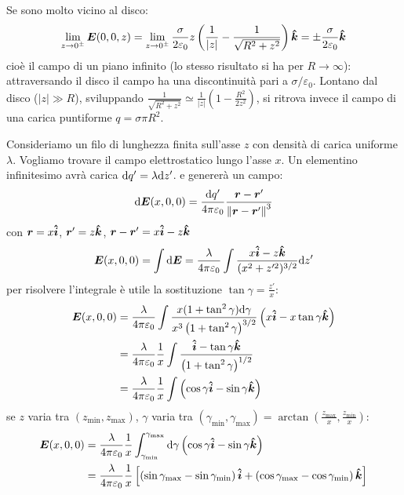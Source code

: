 \begin{Es}[Disco]
  Se sono molto vicino al disco:
  \[
    \lim_{z\to 0^\pm}\boldsymbol{E}(0,0,z)=\lim_{z\to 0^\pm} \frac{\sigma}{2\varepsilon_0} z\left(\frac{1}{|z|}-\frac{1}{\sqrt{R^2+z^2}}\right)\boldsymbol{\hat {k}}=\pm\frac{\sigma}{2\varepsilon_0}\boldsymbol{\hat {k}}
  \]
  cioè il campo di un piano infinito (lo stesso risultato si ha per $R\to\infty$): attraversando il disco il campo ha una discontinuità pari a $\sigma/\varepsilon_0$. Lontano dal disco ($|z|\gg R$), sviluppando $\frac{1}{\sqrt{R^2+z^2}}\simeq\frac{1}{|z|}\left(1-\frac{R^2}{2z^2}\right)$, si ritrova invece il campo di una carica puntiforme $q=\sigma\pi R^2$.
\end{Es}
\begin{Es}
  Consideriamo un filo di lunghezza finita sull'asse $z$ con densità di carica uniforme $\lambda$. Vogliamo trovare il campo elettrostatico lungo l'asse $x$. Un elementino infinitesimo avrà carica $\mathrm{d} q'=\lambda\mathrm{d} z'$. e genererà un campo:
  \[
    \mathrm{d}\boldsymbol{E}(x,0,0) = \frac{\mathrm{d} q'}{4\pi\varepsilon_0}\frac{\boldsymbol{r}-\boldsymbol{r}'}{\left\lVert\boldsymbol{r}-\boldsymbol{r}'\right\rVert^3}
  \]
  con $\boldsymbol{r}=x\boldsymbol{\hat {i}}$, $\boldsymbol{r}'=z\boldsymbol{\hat {k}}$, $\boldsymbol{r}-\boldsymbol{r}'=x\boldsymbol{\hat {i}}-z \boldsymbol{\hat {k}}$
  \[
    \boldsymbol{E}(x,0,0)=\int\mathrm{d} \boldsymbol{E}=\frac{\lambda}{4\pi\varepsilon_0}\int\frac{x\boldsymbol{\hat {i}}-z\boldsymbol{\hat {k}}}{(x^2+z'^2)^{3/2}}\mathrm{d} z'
  \]
  per risolvere l'integrale è utile la sostituzione $\tan\gamma=\frac{z'}{x}$:
  \begin{align*}
    \boldsymbol{E}(x,0,0) & =\frac{\lambda}{4\pi\varepsilon_0}\int\frac{x(1+\tan^2\gamma)\mathrm{d}\gamma}{x^3\left(1+\tan^2\gamma\right)^{3/2}}\left(x\boldsymbol{\hat {i}}-x\tan\gamma\boldsymbol{\hat {k}}\right) \\
                 & =\frac{\lambda}{4\pi\varepsilon_0}\frac{1}{x}\int\frac{\boldsymbol{\hat {i}}-\tan\gamma\boldsymbol{\hat {k}}}{\left(1+\tan^2\gamma\right)^{1/2}}                                  \\
                 & =\frac{\lambda}{4\pi\varepsilon_0}\frac{1}{x}\int\left(\cos\gamma\boldsymbol{\hat {i}}-\sin\gamma\boldsymbol{\hat {k}}\right)
  \end{align*}
  se $z$ varia tra $(z_\text{min},z_\text{max})$, $\gamma$ varia tra $(\gamma_\text{min},\gamma_\text{max})=\arctan\left(\frac{z_\text{max}}{x},\frac{z_\text{min}}{x}\right)$:
  \begin{align*}
    \boldsymbol{E}(x,0,0) & =\frac{\lambda}{4\pi\varepsilon_0}\frac{1}{x}\int_{\gamma_{\text{min}}}^{\gamma_{\text{max}}}\mathrm{d}\gamma\left(\cos\gamma\boldsymbol{\hat {i}}-\sin\gamma\boldsymbol{\hat {k}}\right)                                    \\
                 & =\frac{\lambda}{4\pi\varepsilon_0}\frac{1}{x}\left[\left(\sin\gamma_\text{max}-\sin\gamma_\text{min}\right)\boldsymbol{\hat {i}}+\left(\cos\gamma_\text{max}-\cos\gamma_\text{min}\right)\boldsymbol{\hat {k}}\right]
  \end{align*}



\end{Es}


